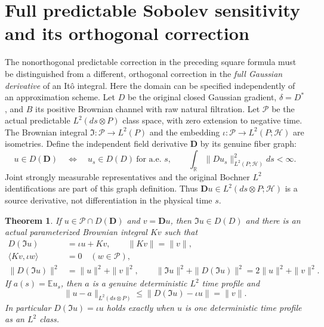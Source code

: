 \documentclass[11pt]{article}
\newtheorem{theorem}{Theorem}[section]
\newcommand{\E}{\mathbb E}
\newcommand{\R}{\mathbb R}
\newcommand{\Hh}{\mathcal H}
\begin{document}
\section{Full predictable Sobolev sensitivity and its orthogonal correction}
The nonorthogonal predictable correction in the preceding square formula
must be distinguished from a different, orthogonal correction in the
\emph{full Gaussian derivative} of an It\^o integral. Here the domain
can be specified independently of an approximation scheme.
Let $D$ be the original closed Gaussian gradient, $\delta=D^*$,
and $B$ its positive Brownian channel with raw natural filtration.
Let $\mathcal P$ be the actual predictable $L^2(ds\otimes P)$
class space, with zero extension to negative time. The Brownian
integral $\mathfrak I:\mathcal P\to L^2(P)$ and the embedding
$\iota:\mathcal P\to L^2(P;\Hh)$ are isometries. Define the
independent field derivative $\mathbf D$ by its genuine fiber graph:
\[
 u\in D(\mathbf D)\quad\Longleftrightarrow\quad
 u_s\in D(D)\ \text{for a.e. }s,\qquad
 \int_{\R}\|Du_s\|_{L^2(P;\Hh)}^2ds<\infty.
\]
Joint strongly measurable representatives and the original Bochner
$L^2$ identifications are part of this graph definition. Thus
$\mathbf Du\in L^2(ds\otimes P;\Hh)$ is a source derivative,
not differentiation in the physical time $s$.

\begin{theorem}\label{thm:fullsensitivity}
If $u\in\mathcal P\cap D(\mathbf D)$ and $v=\mathbf Du$, then
$\mathfrak Iu\in D(D)$ and there is an actual parameterized
Brownian integral $Kv$ such that
\begin{align}
 D(\mathfrak Iu)&=\iota u+Kv,\qquad \|Kv\|=\|v\|,
                     \label{eq:fullsensitivity}\\
 \langle Kv,\iota w\rangle&=0\quad(w\in\mathcal P),
                     \label{eq:sensitivityorth}\\
 \|D(\mathfrak Iu)\|^2&=\|u\|^2+\|v\|^2,\qquad
 \|\mathfrak Iu\|^2+\|D(\mathfrak Iu)\|^2
                      =2\|u\|^2+\|v\|^2.
                     \label{eq:sensitivityenergy}
\end{align}
If $a(s)=\E u_s$, then $a$ is a genuine deterministic $L^2$ time
profile and
\begin{equation}\label{eq:sensitivityrigidity}
 \|u-a\|_{L^2(ds\otimes P)}
       \leq\|D(\mathfrak Iu)-\iota u\|=\|v\|.
\end{equation}
In particular $D(\mathfrak Iu)=\iota u$ holds exactly when $u$
is one deterministic time profile as an $L^2$ class.
\end{theorem}
\end{document}
